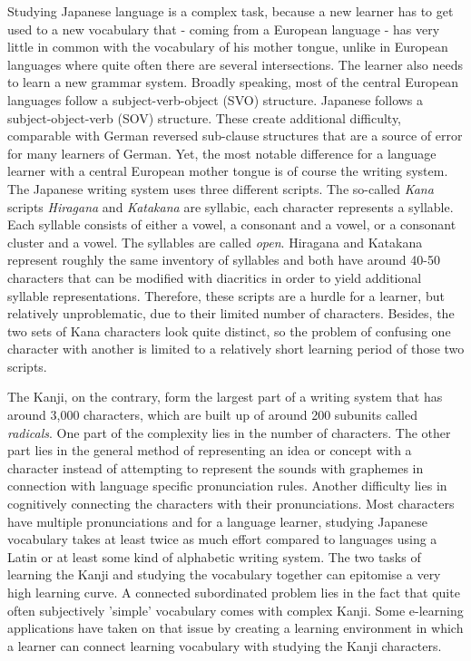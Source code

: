 Studying Japanese language is a complex task, because a new learner has to get 
used to a new vocabulary that - coming from a European language - has very 
little in common with the vocabulary of his mother tongue, unlike in European 
languages where quite often there are several intersections. The learner also 
needs to learn a new grammar system. Broadly speaking, most of the central 
European languages follow a subject-verb-object (SVO) structure. 
Japanese follows a subject-object-verb (SOV) structure. These create additional 
difficulty, comparable with German reversed sub-clause structures that 
are a source of error for many learners of German. 
Yet, the most notable difference for a language learner with a central European 
mother tongue is of course the writing system. The Japanese writing system uses 
three different scripts. The so-called \emph{Kana} scripts \emph{Hiragana} and 
\emph{Katakana} are syllabic, each character represents a syllable. Each syllable
consists of either a vowel, a consonant and a vowel, or a consonant cluster and 
a vowel. The syllables are called \emph{open}. Hiragana and Katakana represent 
roughly the same inventory of syllables and both have around 40-50 characters 
that can be modified with diacritics in order to yield additional syllable 
representations. Therefore, these scripts are a hurdle for a learner, but 
relatively unproblematic, due to their limited number of characters. 
Besides, the two sets of Kana characters look quite distinct, 
so the problem of confusing one character with another is limited to a relatively
short learning period of those two scripts.

The Kanji, on the contrary, form the largest part of a writing system that has 
around 3,000 characters, which are built up of around 200 subunits called 
\emph{radicals}. 
One part of the complexity lies in the number of characters. 
The other part lies in the general method of representing an 
idea or concept with a character instead of attempting to represent the sounds
with graphemes in connection with language specific pronunciation rules. 
Another difficulty lies in cognitively connecting the characters with their 
pronunciations. Most characters have multiple pronunciations and for a language 
learner, studying Japanese vocabulary takes at least twice as much effort 
compared to languages using a Latin or at least some kind of alphabetic writing 
system. The two tasks of learning the Kanji and studying the vocabulary 
together can epitomise a very high learning curve. A connected subordinated 
problem lies in the fact that quite often subjectively 'simple' vocabulary comes 
with complex Kanji. Some e-learning applications have taken on that issue by 
creating a learning environment in which a learner can connect learning 
vocabulary with studying the Kanji characters.

